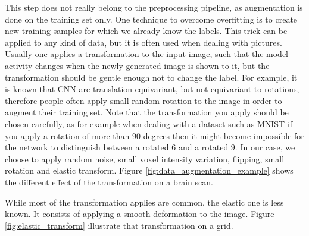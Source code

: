 This step does not really belong to the preprocessing pipeline, as augmentation is done on the training set only. One technique to overcome overfitting is to create new training samples for which we already know the labels. This trick can be applied to any kind of data, but it is often used when dealing with pictures. Usually one applies a transformation to the input image, such that the model activity changes when the newly generated image is shown to it, but the transformation should be gentle enough not to change the label. 
For example, it is known that CNN are translation equivariant, but not equivariant to rotations, therefore people often apply small random rotation to the image in order to augment their training set. Note that the transformation you apply should be chosen carefully, as for example when dealing with a dataset such as MNIST if you apply a rotation of more than 90 degrees then it might become impossible for the network to distinguish between a rotated $6$ and a rotated $9$. 
In our case, we choose to apply random noise, small voxel intensity variation, flipping, small rotation and elastic transform. Figure \ref{fig:data_augmentation_example} shows the different effect of the transformation on a brain scan.

While most of the transformation applies are common, the elastic one is less known. It consists of applying a smooth deformation to the image. Figure \ref{fig:elastic_transform} illustrate that transformation on a grid.



